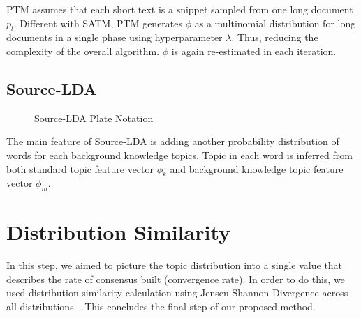 \documentclass[senior]{IPSstyle}
\begin{document}
PTM assumes that each short text is a snippet sampled from one long document $p_l$. Different with SATM, PTM generates $\phi$ as a multinomial distribution for long documents in a single phase using hyperparameter $\lambda$. Thus, reducing the complexity of the overall algorithm. $\phi$ is again re-estimated in each iteration.

\subsection{Source-LDA~\cite{wood}}

\begin{figure}[h]
	\centering
	\caption{Source-LDA Plate Notation}
\label{fig_src}
\end{figure}

The main feature of Source-LDA is adding another probability distribution of words for each background knowledge topics. Topic in each word is inferred from both standard topic feature vector $\phi_k$ and background knowledge topic feature vector $\phi_m$.

\section{Distribution Similarity}

In this step, we aimed to picture the topic distribution into a single value that describes the rate of consensus built (convergence rate). In order to do this, we used distribution similarity calculation using Jensen-Shannon Divergence across all distributions~\cite{aslam}. This concludes the final step of our proposed method.
\end{document}

